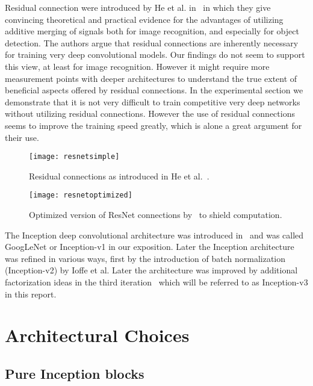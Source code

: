 \documentclass[10pt,twocolumn,letterpaper]{article}
\begin{document}
Residual connection were introduced by He et al. in~\cite{he2015deep} in
which they give convincing theoretical and practical evidence for the
advantages of utilizing additive merging of signals both for image recognition, and especially for object detection.
The authors argue that residual connections are inherently necessary for training
very deep convolutional models. Our findings do not seem to support this
view, at least for image recognition. However it might require more
measurement points with deeper architectures to understand the true extent
of beneficial aspects offered by residual connections.
In the experimental section we demonstrate that it is not very difficult to
train competitive very deep networks without utilizing residual connections.
However the use of residual connections seems to improve the training speed
greatly, which is alone a great argument for their use.
\begin{figure}
\centering
\texttt{[image: resnetsimple]}
\caption{Residual connections as introduced in He et al.~\cite{he2015deep}.}
\label{fig:resnetsimple}
\end{figure}
\begin{figure}
\centering
\texttt{[image: resnetoptimized]}
\caption{Optimized version of ResNet connections by~\cite{he2015deep} to
  shield computation.}
\label{fig:resnetoptimized}
\end{figure}
The Inception deep convolutional architecture was introduced
in~\cite{szegedy2015going} and was called GoogLeNet or Inception-v1 in our
exposition.
Later the Inception architecture was refined in various ways,
first by the introduction of batch normalization
~\cite{ioffe2015batch} (Inception-v2) by Ioffe et al.
Later the architecture was improved by additional factorization ideas in the
third iteration~\cite{szegedy2015rethinking} which will be referred to as
Inception-v3 in this report.
 \section{Architectural Choices}
\label{arch}

\subsection{Pure Inception blocks}
\end{document}
